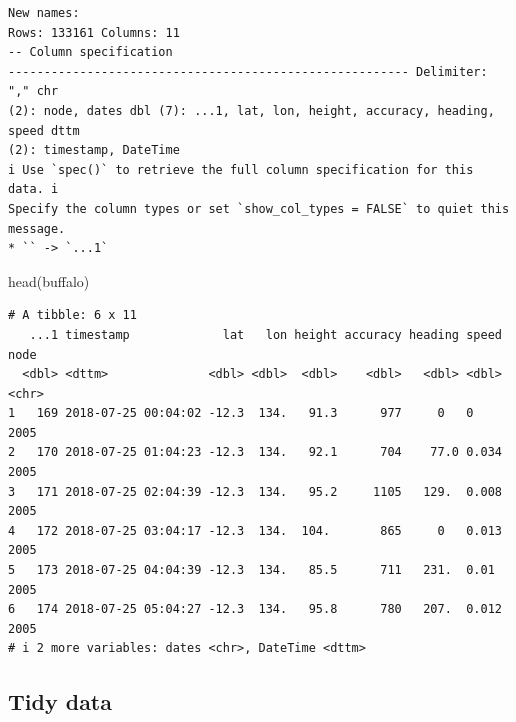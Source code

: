 \documentclass[
  letterpaper,
  DIV=11,
  numbers=noendperiod]{scrartcl}
\newenvironment{Shaded}{\begin{snugshade}}{\end{snugshade}}
\newcommand{\FunctionTok}[1]{\textcolor[rgb]{0.28,0.35,0.67}{#1}}
\newcommand{\NormalTok}[1]{\textcolor[rgb]{0.00,0.23,0.31}{#1}}
\begin{document}
\begin{verbatim}
New names:
Rows: 133161 Columns: 11
-- Column specification
-------------------------------------------------------- Delimiter: "," chr
(2): node, dates dbl (7): ...1, lat, lon, height, accuracy, heading, speed dttm
(2): timestamp, DateTime
i Use `spec()` to retrieve the full column specification for this data. i
Specify the column types or set `show_col_types = FALSE` to quiet this message.
* `` -> `...1`
\end{verbatim}

\begin{Shaded}
\begin{Highlighting}[]
\FunctionTok{head}\NormalTok{(buffalo)}
\end{Highlighting}
\end{Shaded}

\begin{verbatim}
# A tibble: 6 x 11
   ...1 timestamp             lat   lon height accuracy heading speed node 
  <dbl> <dttm>              <dbl> <dbl>  <dbl>    <dbl>   <dbl> <dbl> <chr>
1   169 2018-07-25 00:04:02 -12.3  134.   91.3      977     0   0     2005 
2   170 2018-07-25 01:04:23 -12.3  134.   92.1      704    77.0 0.034 2005 
3   171 2018-07-25 02:04:39 -12.3  134.   95.2     1105   129.  0.008 2005 
4   172 2018-07-25 03:04:17 -12.3  134.  104.       865     0   0.013 2005 
5   173 2018-07-25 04:04:39 -12.3  134.   85.5      711   231.  0.01  2005 
6   174 2018-07-25 05:04:27 -12.3  134.   95.8      780   207.  0.012 2005 
# i 2 more variables: dates <chr>, DateTime <dttm>
\end{verbatim}

\subsection{Tidy data}\label{tidy-data}
\end{document}
